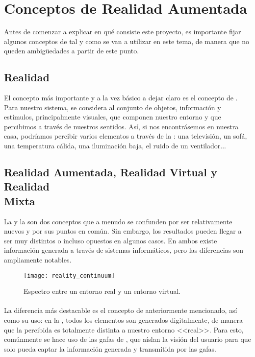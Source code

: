 \documentclass{subfiles}
\begin{document}
        \section{Conceptos de Realidad Aumentada}
        \label{sec:1.4}

        Antes de comenzar a explicar en qué consiste este proyecto, es importante fijar algunos conceptos de \ra tal y como se van a utilizar en este tema, de manera que no queden ambigüedades a partir de este punto.

        \subsection{Realidad}
        \label{sec:1.4.1}
        El concepto más importante y a la vez básico a dejar claro es el concepto de \realidad. Para nuestro sistema, se considera \realidad al conjunto de objetos, información y estímulos, principalmente visuales, que componen nuestro entorno y que percibimos a través de nuestros sentidos. Así, si nos encontrásemos en nuestra casa, podríamos percibir varios elementos a través de la \realidad: una televisión, un sofá, una temperatura cálida, una iluminación baja, el ruido de un ventilador...

        \subsection[Realidad Aumentada, Realidad Virtual y Realidad Mixta]{Realidad Aumentada, Realidad Virtual y Realidad \\Mixta}
        \label{sec:1.4.2}

        La \ra y la \rv son dos conceptos que a menudo se confunden por ser relativamente nuevos y por sus puntos en común. Sin embargo, los resultados pueden llegar a ser muy distintos o incluso opuestos en algunos casos. En ambos existe información generada a través de sistemas informáticos, pero las diferencias son ampliamente notables.

        \begin{figure}[H]
        \centering
        \texttt{[image: reality\_continuum]}
        \caption{Espectro entre un entorno real y un entorno virtual.}
        \label{fig:reality_continuum}
        \end{figure}

        \paragraph{}
        La diferencia más destacable es el concepto de \realidad anteriormente mencionado, así como su uso: en la \rv, todos los elementos son generados digitalmente, de manera que la \realidad percibida es totalmente distinta a nuestro entorno <<real>>. Para esto, comúnmente se hace uso de las gafas de \rv, que aíslan la visión del usuario para que solo pueda captar la información generada y transmitida por las gafas.
    
\end{document}
